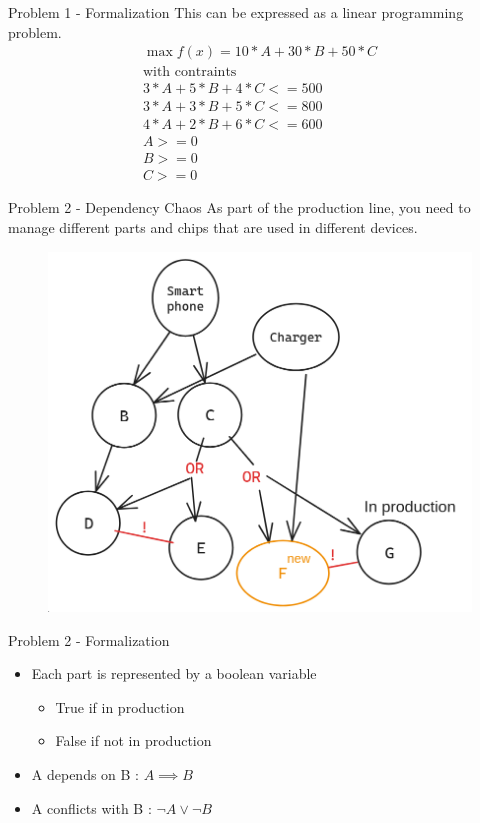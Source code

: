\documentclass{beamer}
\begin{document}
\begin{frame}{Problem 1 - Formalization}
This can be expressed as a linear programming problem.  
\begin{align}
\max f(x) = 10 * A + 30 * B + 50 * C \\
\text{with contraints}\\
3*A + 5*B+ 4*C <= 500 \\
3*A + 3*B + 5*C <= 800 \\
4*A + 2*B + 6*C <= 600 \\
A>=0 \\
B>=0 \\
C>=0
\end{align}
\end{frame}

\begin{frame}{Problem 2 - Dependency Chaos}
	As part of the production line, you need to manage different parts and chips that are used in different devices.
	\begin{figure}
		\includegraphics[scale=0.25]{../Images/deps.png}
	\end{figure}
\end{frame}

\begin{frame}{Problem 2 - Formalization}
	\begin{itemize}
		\item Each part is represented by a boolean variable
		\begin{itemize}
		\item True if in production
		\item False if not in production
		\end{itemize}
		\item A depends on B : $A \implies B$
		\item A conflicts with B : $\neg A \lor \neg B$
	\end{itemize}
\end{frame}
\end{document}
